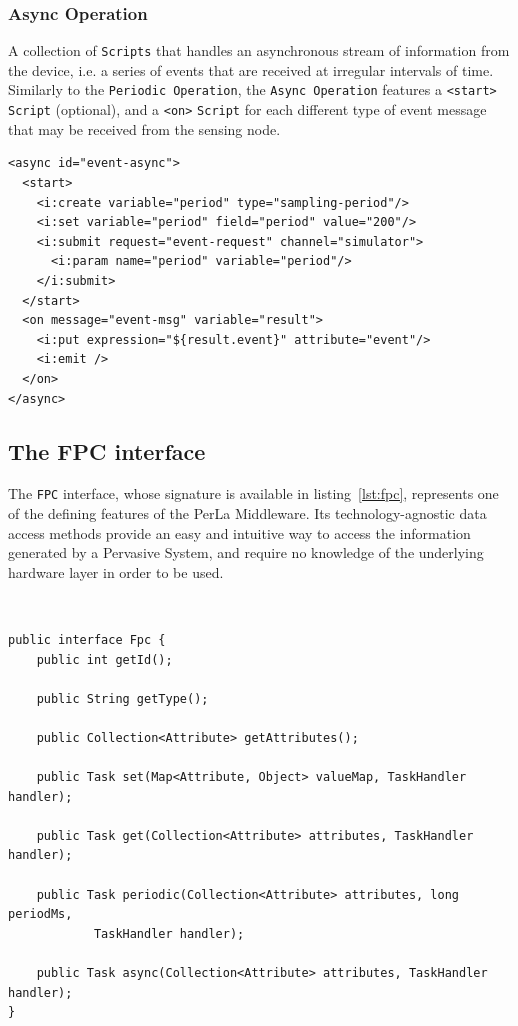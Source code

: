 \subsubsection{Async Operation}

A collection of \texttt{Scripts} that handles an asynchronous stream of
information from the device, i.e. a series of events that are received at
irregular intervals of time. Similarly to the \texttt{Periodic Operation}, the
\texttt{Async Operation} features a \lstinline!<start>! \texttt{Script}
(optional), and a \lstinline!<on>! \texttt{Script} for each different type of
event message that may be received from the sensing node.

\lstset{language=XML}
\begin{lstlisting}
<async id="event-async">
  <start>
    <i:create variable="period" type="sampling-period"/>
    <i:set variable="period" field="period" value="200"/>
    <i:submit request="event-request" channel="simulator">
      <i:param name="period" variable="period"/>
    </i:submit>
  </start>
  <on message="event-msg" variable="result">
    <i:put expression="${result.event}" attribute="event"/>
    <i:emit />
  </on>
</async>
\end{lstlisting}


\subsection{The FPC interface}

The \texttt{FPC} interface, whose signature is available in
listing~\ref{lst:fpc}, represents one of the defining features of the PerLa
Middleware. Its technology-agnostic data access methods provide an easy and
intuitive way to access the information generated by a Pervasive System, and
require no knowledge of the underlying hardware layer in order to be used.

~\\
\lstset{language=java}
\begin{lstlisting}[caption=The FPC interface,label={lst:fpc}]
public interface Fpc {
    public int getId();

    public String getType();

    public Collection<Attribute> getAttributes();

    public Task set(Map<Attribute, Object> valueMap, TaskHandler handler);

    public Task get(Collection<Attribute> attributes, TaskHandler handler);

    public Task periodic(Collection<Attribute> attributes, long periodMs,
            TaskHandler handler);

    public Task async(Collection<Attribute> attributes, TaskHandler handler);
}
\end{lstlisting}

